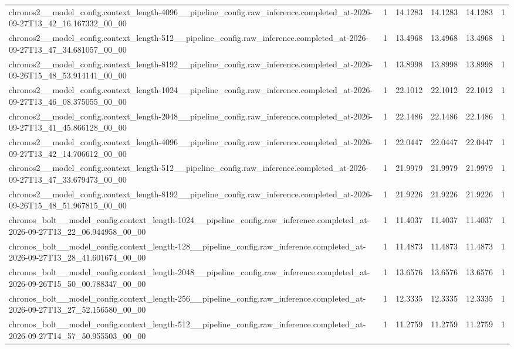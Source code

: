 \begin{tabular}{llllll}
chronos2\_\_model\_config.context\_length-4096\_\_pipeline\_config.raw\_inference.completed\_at-2026-09-27T13\_42\_16.167332\_00\_00 & 1 & 14.1283 & 14.1283 & 14.1283 & 1 \\
chronos2\_\_model\_config.context\_length-512\_\_pipeline\_config.raw\_inference.completed\_at-2026-09-27T13\_47\_34.681057\_00\_00 & 1 & 13.4968 & 13.4968 & 13.4968 & 1 \\
chronos2\_\_model\_config.context\_length-8192\_\_pipeline\_config.raw\_inference.completed\_at-2026-09-26T15\_48\_53.914141\_00\_00 & 1 & 13.8998 & 13.8998 & 13.8998 & 1 \\
chronos2\_\_model\_config.context\_length-1024\_\_pipeline\_config.raw\_inference.completed\_at-2026-09-27T13\_46\_08.375055\_00\_00 & 1 & 22.1012 & 22.1012 & 22.1012 & 1 \\
chronos2\_\_model\_config.context\_length-2048\_\_pipeline\_config.raw\_inference.completed\_at-2026-09-27T13\_41\_45.866128\_00\_00 & 1 & 22.1486 & 22.1486 & 22.1486 & 1 \\
chronos2\_\_model\_config.context\_length-4096\_\_pipeline\_config.raw\_inference.completed\_at-2026-09-27T13\_42\_14.706612\_00\_00 & 1 & 22.0447 & 22.0447 & 22.0447 & 1 \\
chronos2\_\_model\_config.context\_length-512\_\_pipeline\_config.raw\_inference.completed\_at-2026-09-27T13\_47\_33.679473\_00\_00 & 1 & 21.9979 & 21.9979 & 21.9979 & 1 \\
chronos2\_\_model\_config.context\_length-8192\_\_pipeline\_config.raw\_inference.completed\_at-2026-09-26T15\_48\_51.967815\_00\_00 & 1 & 21.9226 & 21.9226 & 21.9226 & 1 \\
chronos\_bolt\_\_model\_config.context\_length-1024\_\_pipeline\_config.raw\_inference.completed\_at-2026-09-27T13\_22\_06.944958\_00\_00 & 1 & 11.4037 & 11.4037 & 11.4037 & 1 \\
chronos\_bolt\_\_model\_config.context\_length-128\_\_pipeline\_config.raw\_inference.completed\_at-2026-09-27T13\_28\_41.601674\_00\_00 & 1 & 11.4873 & 11.4873 & 11.4873 & 1 \\
chronos\_bolt\_\_model\_config.context\_length-2048\_\_pipeline\_config.raw\_inference.completed\_at-2026-09-26T15\_50\_00.788347\_00\_00 & 1 & 13.6576 & 13.6576 & 13.6576 & 1 \\
chronos\_bolt\_\_model\_config.context\_length-256\_\_pipeline\_config.raw\_inference.completed\_at-2026-09-27T13\_27\_52.156580\_00\_00 & 1 & 12.3335 & 12.3335 & 12.3335 & 1 \\
chronos\_bolt\_\_model\_config.context\_length-512\_\_pipeline\_config.raw\_inference.completed\_at-2026-09-27T14\_57\_50.955503\_00\_00 & 1 & 11.2759 & 11.2759 & 11.2759 & 1 \\

\end{tabular}
